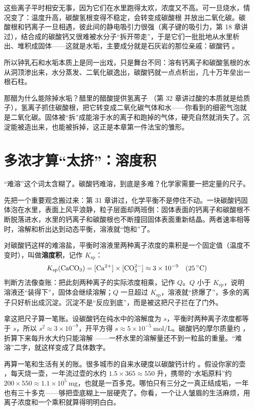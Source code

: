 这些离子平时相安无事，因为它们在水里跑得太欢，浓度又不高。可一旦烧水，情况变了：温度升高，碳酸氢根变得不稳定，会转变成碳酸根  并放出二氧化碳。碳酸根和钙离子一旦相遇，彼此间的静电吸引力很强（离子键的吸引力，第 18 章讲过），结合成的碳酸钙又很难被水分子“拆开带走”，于是它们一批批地从水里析出、堆积成固体——这就是水垢，主要成分就是石灰岩的那位亲戚：碳酸钙 。

所以钟乳石和水垢本质上是同一出戏，只是舞台不同：溶有钙离子和碳酸氢根的水从洞顶渗出来，水分蒸发、二氧化碳逸出，碳酸钙就一点点析出，几十万年垒出一根石柱。

那醋为什么能除掉水垢？醋里的醋酸提供氢离子 （第 32 章讲过酸的本质就是给质子），氢离子抓住碳酸根，把它转变成二氧化碳气体和水——你看到的细密气泡就是二氧化碳。固体被“拆”成能溶于水的离子和跑掉的气体，硬壳自然就消失了。沉淀能被造出来，也能被拆掉，这正是本章第一件法宝的雏形。

\section{多浓才算“太挤”：溶度积}

“难溶”这个词太含糊了。碳酸钙难溶，到底是多难？化学家需要一把定量的尺子。

先把一个重要观念搬过来：第 31 章讲过，化学平衡不是停住不动。一块碳酸钙固体泡在水里，表面上风平浪静，粒子层面却两班倒：固体表面的钙离子和碳酸根不断脱落进水，水里的钙离子和碳酸根也不断撞回固体表面重新结晶。两者速率相等时，溶解和析出达到动态平衡，溶液就“饱和”了。

\begin{qiaoliang}
对碳酸钙这样的难溶盐，平衡时溶液里两种离子浓度的乘积是一个固定值（温度不变时），叫做\textbf{溶度积}，记作 $K_{\mathrm{sp}}$：
\[K_{\mathrm{sp}}(\mathrm{CaCO_3}) = [\mathrm{Ca^{2+}}]\times[\mathrm{CO_3^{2-}}] \approx 3\times10^{-9}\quad(25\,^{\circ}\mathrm{C})\]
判断方法像查账：把此刻两种离子的实际浓度相乘，记作 $Q$。$Q$ 小于 $K_{\mathrm{sp}}$，说明溶液还“装得下”，固体会继续溶解；$Q$ 一旦超过 $K_{\mathrm{sp}}$，溶液就“挤爆了”，多余的离子只好析出成沉淀。沉淀不是“反应到底”，而是被这把尺子拦在了门外。
\end{qiaoliang}

拿这把尺子算一笔账。设碳酸钙在纯水中的溶解度为 $s$，平衡时两种离子浓度都等于 $s$，所以 $s^2\approx3\times10^{-9}$，开平方得 $s\approx5\times10^{-5}\ \mathrm{mol/L}$。碳酸钙的摩尔质量约 ，折算下来每升水大约只能溶解 ——一杯水里的溶解量还不到一粒盐的重量。“难溶”二字，就这样变成了具体数字。

再算一笔和生活有关的账。很多城市的自来水硬度以碳酸钙计约 。假设你家的壶 ，每天烧一壶，一年流过壶的水约 $1.5\times365\approx550$ 升，携带的“水垢原料”约 $200\times550\approx1.1\times10^{5}\ \mathrm{mg}$，也就是一百多克。哪怕只有三分之一真正结成垢，一年也有三十多克——够把壶底糊上一层硬壳了。你看，一个让人皱眉的生活麻烦，用离子浓度和一个乘积就算得明明白白。

